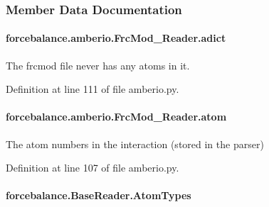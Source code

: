 \subsubsection{Member Data Documentation}
\hypertarget{classforcebalance_1_1amberio_1_1FrcMod__Reader_afee8f33a13244afd3f595acad27e04f4}{
\paragraph[{adict}]{\setlength{\rightskip}{0pt plus 5cm}forcebalance.\-amberio.\-Frc\-Mod\-\_\-\-Reader.\-adict}}\label{classforcebalance_1_1amberio_1_1FrcMod__Reader_afee8f33a13244afd3f595acad27e04f4}


The frcmod file never has any atoms in it. 



Definition at line 111 of file amberio.\-py.

\hypertarget{classforcebalance_1_1amberio_1_1FrcMod__Reader_a2e670a076d15771ee362f76e04a80419}{
\paragraph[{atom}]{\setlength{\rightskip}{0pt plus 5cm}forcebalance.\-amberio.\-Frc\-Mod\-\_\-\-Reader.\-atom}}\label{classforcebalance_1_1amberio_1_1FrcMod__Reader_a2e670a076d15771ee362f76e04a80419}


The atom numbers in the interaction (stored in the parser) 



Definition at line 107 of file amberio.\-py.

\hypertarget{classforcebalance_1_1BaseReader_a69ca7d949a4a3df4d9f61e617fe0e270}{
\paragraph[{Atom\-Types}]{\setlength{\rightskip}{0pt plus 5cm}forcebalance.\-Base\-Reader.\-Atom\-Types\hspace{0.3cm}{\ttfamily [inherited]}}}\label{classforcebalance_1_1BaseReader_a69ca7d949a4a3df4d9f61e617fe0e270}


